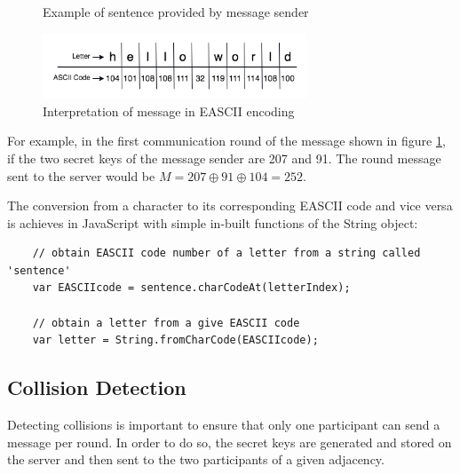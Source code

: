 \begin{figure}[H]
    \centering
    \caption{Example of sentence provided by message sender }
    \label{fig:exampleMessage}
\end{figure}


\begin{figure}[H]
    \centering
    \includegraphics[width=0.70\textwidth]{Images/Implementation/messageInASCII.png}
    \caption{Interpretation of message in EASCII encoding}
    \label{fig:exampleInASCII}
\end{figure}

For example, in the first communication round of the message shown in figure \ref{fig:exampleMessage}, if the two secret keys of the message sender are 207 and 91. The round message sent to the server would be $M = 207 \oplus 91 \oplus 104 = 252$.

The conversion from a character to its corresponding EASCII code and vice versa is achieves in JavaScript with simple in-built functions of the String object: 
\begin{lstlisting}
    // obtain EASCII code number of a letter from a string called 'sentence'
    var EASCIIcode = sentence.charCodeAt(letterIndex);

    // obtain a letter from a give EASCII code
    var letter = String.fromCharCode(EASCIIcode);
\end{lstlisting}



\subsection{Collision Detection}
Detecting collisions is important to ensure that only one participant can send a message per round. In order to do so, the secret keys are generated and stored on the server and then sent to the two participants of a given adjacency. 

